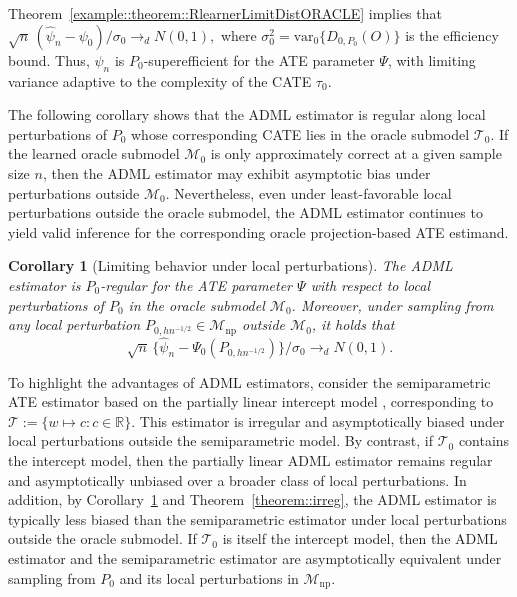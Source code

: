 \documentclass[11pt]{article}
\newtheorem{corollary}{Corollary}
\theoremstyle{definition}
\begin{document}
Theorem~\ref{example::theorem::RlearnerLimitDistORACLE} implies that $\sqrt{n}\,(\widehat{\psi}_n-\psi_0)/\sigma_0 \rightarrow_d N(0,1),$
where \(\sigma_0^2 = \mathrm{var}_{0}\{D_{0,P_0}(O)\}\) is the efficiency bound. Thus, \(\widehat{\psi}_n\) is \(P_0\)-superefficient for the ATE parameter \(\Psi\), with limiting variance adaptive to the complexity of the CATE \(\tau_0\).  
 

 
 The following corollary shows that the ADML estimator is regular along local perturbations of \(P_0\) whose corresponding CATE lies in the oracle submodel \(\mathcal{T}_0\). If the learned oracle submodel \(\mathcal{M}_0\) is only approximately correct at a given sample size \(n\), then the ADML estimator may exhibit asymptotic bias under perturbations outside \(\mathcal{M}_0\). Nevertheless, even under least-favorable local perturbations outside the oracle submodel, the ADML estimator continues to yield valid inference for the corresponding oracle projection-based ATE estimand.

\begin{corollary}[Limiting behavior under local perturbations]
     \label{cor::CATEinf}  The ADML estimator is \(P_0\)-regular for the ATE parameter \(\Psi\) with respect to local perturbations of \(P_0\) in the oracle submodel \(\mathcal{M}_0\). Moreover, under sampling from any local perturbation \(P_{0,hn^{-1/2}} \in \mathcal{M}_{\mathrm{np}}\) outside \(\mathcal{M}_0\), it holds that
   \[
   \sqrt{n}\,\{\widehat{\psi}_n-\Psi_0(P_{0,hn^{-1/2}})\}/\sigma_0 \rightarrow_d N(0,1).
   \]
 
\end{corollary}

To highlight the advantages of ADML estimators, consider the semiparametric ATE estimator based on the partially linear intercept model \citep{robinson1988root,imbensOverlapEstimand2006, li2019overlapWeights, d2021overlap}, corresponding to \(\mathcal{T}:=\{w \mapsto c : c \in \mathbb{R}\}\). This estimator is irregular and asymptotically biased under local perturbations outside the semiparametric model. By contrast, if \(\mathcal{T}_0\) contains the intercept model, then the partially linear ADML estimator remains regular and asymptotically unbiased over a broader class of local perturbations. In addition, by Corollary~\ref{cor::CATEinf} and Theorem~\ref{theorem::irreg}, the ADML estimator is typically less biased than the semiparametric estimator under local perturbations outside the oracle submodel. If \(\mathcal{T}_0\) is itself the intercept model, then the ADML estimator and the semiparametric estimator are asymptotically equivalent under sampling from \(P_0\) and its local perturbations in \(\mathcal{M}_{\mathrm{np}}\).
\end{document}
